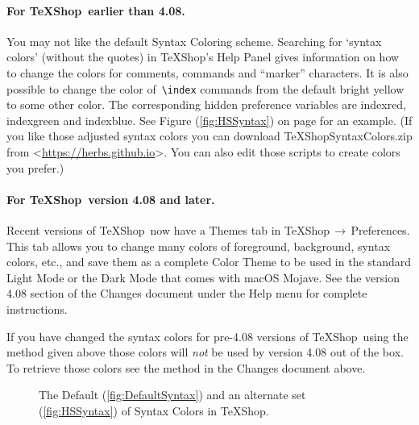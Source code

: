 \documentclass[letterpaper,11pt]{article}
\newcommand{\TS}{\textsf{\TeX Shop}}
\newcommand{\cmd}[1]{\textsf{#1}}
\newcommand{\mnu}[1]{\textsf{#1}}
\newcommand{\To}{\,\(\to\)\,}
\begin{document}
\paragraph{For \TS\ earlier than 4.08.}
You may not like the default Syntax Coloring scheme. Searching for `\cmd{syntax colors}' (without the quotes) in \TS's Help Panel gives information on how to change the colors for comments, commands and ``marker'' characters. It is also possible to change the color of\, \verb"\index" commands from the default bright yellow to some other color. The corresponding hidden preference variables are \cmd{indexred}, \cmd{indexgreen} and \cmd{indexblue}. See Figure (\ref{fig:HSSyntax}) on page \pageref{fig:HSSyntax} for an example. (If you like those adjusted syntax colors you can download \cmd{TeXShopSyntaxColors.zip} from <\url{https://herbs.github.io}>. You can also edit those scripts to create colors you prefer.)

\paragraph{For \TS\ version 4.08 and later.}
Recent versions of \TS\ now have a \cmd{Themes} tab in \mnu{\TS}\To\mnu{Preferences}. This tab allows you to change many colors of foreground, background, syntax colors, etc., and save them as a complete Color Theme to be used in the standard Light Mode or the Dark Mode that comes with \cmd{macOS Mojave}. See the version 4.08 section of the \cmd{Changes} document under the \mnu{Help} menu for complete instructions.

If you have changed the syntax colors for pre-4.08 versions of \TS\ using the method given above those colors will \emph{not} be used by version 4.08 out of the box. To retrieve those colors see the method in the \cmd{Changes} document above.
\begin{figure}
\centering
{}%
\qquad%
%
\caption[\TS\ Syntax Colors]{The Default (\ref{fig:DefaultSyntax}) and an alternate set (\ref{fig:HSSyntax}) of Syntax Colors in \TS.}
\label{fig:SyntaxColors}
\end{figure}
\end{document}
